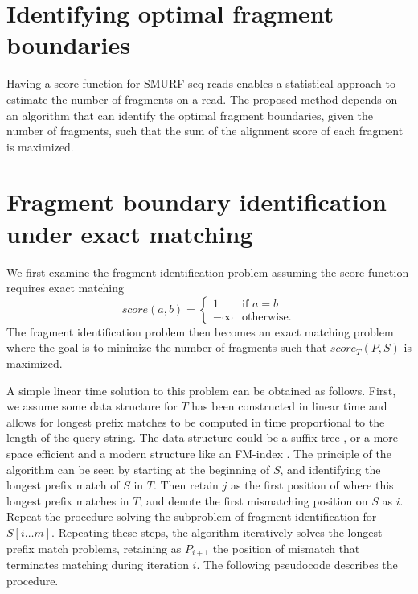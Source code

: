 \section{Identifying optimal fragment boundaries}

Having a score function for SMURF-seq reads enables a statistical
approach to estimate the number of fragments on a read. The proposed
method depends on an algorithm that can identify the optimal fragment
boundaries, given the number of fragments, such that the sum of the
alignment score of each fragment is maximized.

\section{Fragment boundary identification under exact matching}
We first examine the fragment identification problem assuming the score
function requires exact matching
\[score(a,b)=
\begin{cases}
  1 & \text{if } a = b \\
  -\infty & \text{otherwise.}
\end{cases}\]
The fragment identification problem then becomes an exact matching
problem where the goal is to minimize the number of fragments such that
$score_T(P,S)$ is maximized.

A simple linear time solution to this problem can be obtained as
follows. First, we assume some data structure for $T$ has been
constructed in linear time and allows for longest prefix matches to be
computed in time proportional to the length of the query string. The
data structure could be a suffix tree \citep{mccreight1976space}, or a
more space efficient and a modern structure like an FM-index
\citep{ferragina2000opportunistic}. The principle of the algorithm can be
seen by starting at the beginning of $S$, and identifying the longest
prefix match of $S$ in $T$. Then retain $j$ as the first position of
where this longest prefix matches in $T$, and denote the first
mismatching position on $S$ as $i$. Repeat the procedure solving the
subproblem of fragment identification for $S[i\dots m]$. Repeating these
steps, the algorithm iteratively solves the longest prefix match
problems, retaining as $P_{i+1}$ the position of mismatch that
terminates matching during iteration $i$. The following pseudocode
describes the procedure.

